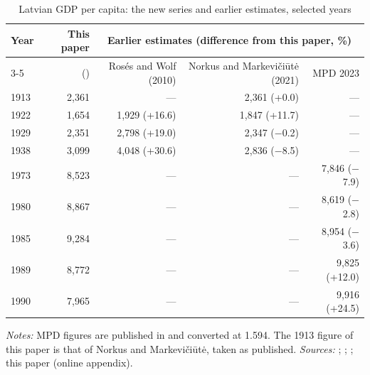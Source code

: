 \begin{table}[htbp]
\centering\small
\caption{Latvian GDP per capita: the new series and earlier estimates, selected years}
\label{tab:previous}
\begin{threeparttable}
\begin{tabular}{lrrrr}
\toprule
Year & This paper & \multicolumn{3}{c}{Earlier estimates (difference from this paper, \%)} \\
\cmidrule(lr){3-5}
& (\intlnineteen{}) & Ros\'{e}s and Wolf (2010) & Norkus and Markevi\v{c}i\={u}t\.{e} (2021) & MPD 2023 \\
\midrule
1913 & 2,361 & --- & 2,361 (+0.0) & --- \\
1922 & 1,654 & 1,929 (+16.6) & 1,847 (+11.7) & --- \\
1929 & 2,351 & 2,798 (+19.0) & 2,347 ($-$0.2) & --- \\
1938 & 3,099 & 4,048 (+30.6) & 2,836 ($-$8.5) & --- \\
1973 & 8,523 & --- & --- & 7,846 ($-$7.9) \\
1980 & 8,867 & --- & --- & 8,619 ($-$2.8) \\
1985 & 9,284 & --- & --- & 8,954 ($-$3.6) \\
1989 & 8,772 & --- & --- & 9,825 (+12.0) \\
1990 & 7,965 & --- & --- & 9,916 (+24.5) \\
\bottomrule
\end{tabular}
\begin{tablenotes}
\footnotesize
\textit{Notes:} MPD figures are published in \intltwenty{} and converted at 1.594. The 1913 figure of this paper is that of Norkus and Markevi\v{c}i\={u}t\.{e}, taken as published. \textit{Sources:} \textcite[190]{roseswolf2010}; \textcite[603]{norkusmark2021}; \textcite{mpd2023}; this paper (online appendix).
\end{tablenotes}
\end{threeparttable}
\end{table}
